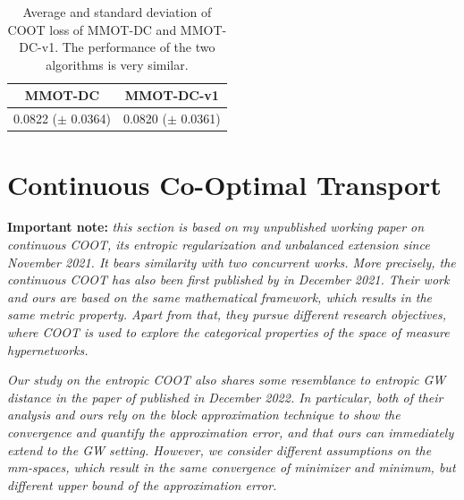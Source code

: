 \begin{table}[H]
  \label{tab:coot_new}
  \begin{center}
    \begin{small}
      \begin{sc}
        \begin{tabular}{|c|c|}
          \hline
          MMOT-DC & MMOT-DC-v1 \\
          \hline
          0.0822 ($\pm$ 0.0364) & 0.0820 ($\pm$ 0.0361) \\
          \hline
        \end{tabular}
      \end{sc}
    \end{small}
  \end{center}
  \caption{Average and standard deviation of COOT loss of MMOT-DC and MMOT-DC-v1. The performance of the two algorithms is
  very similar.}
\end{table}

\section{Continuous Co-Optimal Transport}

\textbf{Important note:} \textit{this section is based on my unpublished working paper
on continuous COOT, its entropic regularization and unbalanced extension since November 2021.
It bears similarity with two concurrent works. More precisely, the continuous COOT
has also been first published by \citep{Chowdhury21b} in December 2021. Their work and ours
are based on the same mathematical framework, which results in the same metric property.
Apart from that, they pursue different research objectives, where
COOT is used to explore the categorical properties of the space of measure hypernetworks.}

\textit{Our study on the entropic COOT also shares some resemblance to
entropic GW distance in the paper of \citep{Zhang23} published in December 2022.
In particular, both of their analysis and ours rely on the block approximation technique
\citep{Carlier17} to show the convergence and quantify the approximation error,
and that ours can immediately extend to the GW setting. However, we consider different assumptions
on the mm-spaces, which result in the same convergence of minimizer and minimum,
but different upper bound of the approximation error.}

